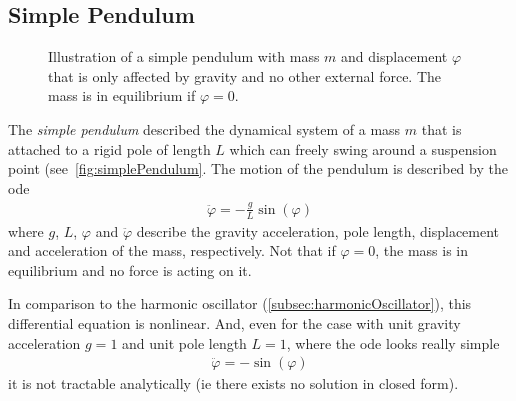 		\subsection{Simple Pendulum}
			\label{subsec:simplePendulum}
			
			\begin{figure}
				\centering
				\tikzSimplePendulum
				\caption{Illustration of a simple pendulum with mass \(m\) and displacement \(\varphi\) that is only affected by gravity and no other external force. The mass is in equilibrium if \( \varphi = 0 \).}
				\label{fig:simplePendulum}
			\end{figure}
		
			The \emph{simple pendulum} described the dynamical system of a mass \(m\) that is attached to a rigid pole of length \(L\) which can freely swing around a suspension point (see~\autoref{fig:simplePendulum}. The motion of the pendulum is described by the \ac{ode}
			\begin{align*}
				\ddot{\varphi} = -\frac{g}{L} \sin(\varphi)
			\end{align*}
			where \(g\), \(L\), \(\varphi\) and \(\ddot{\varphi}\) describe the gravity acceleration, pole length, displacement and acceleration of the mass, respectively. Not that if \( \varphi = 0 \), the mass is in equilibrium and no force is acting on it.
			
			In comparison to the harmonic oscillator (\autoref{subsec:harmonicOscillator}), this differential equation is nonlinear. And, even for the case with unit gravity acceleration \( g = 1 \) and unit pole length \( L = 1\), where the \ac{ode} looks really simple
			\begin{align*}
				\ddot{\varphi} = -\sin(\varphi)
			\end{align*}
			it is not tractable analytically (\ac{ie} there exists no solution in closed form).
